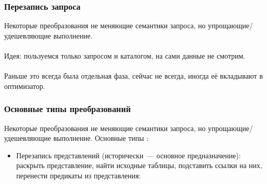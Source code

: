 \documentclass{beamer}
\begin{document}
\begin{frame}[allowframebreaks]
\frametitle{Перезапись запроса}
Некоторые преобразования не меняющие семантики запроса, но упрощающие/удешевляющие выполнение. 
\\~\\
Идея: пользуемся только запросом и каталогом, на сами данные не смотрим.
\\~\\
Раньше это всегда была отдельная фаза, сейчас не всегда, иногда её вкладывают в оптимизатор.

\end{frame}

\begin{frame}[allowframebreaks]
\frametitle{Основные типы преобразований}
Некоторые преобразования не меняющие семантики запроса, но упрощающие/удешевляющие выполнение. Основные типы \cite{Hellerstein2007}:
\begin{itemize}
  \item Перезапись представлений (исторически~--- основное предназначение):
  		раскрыть представление, найти исходные таблицы, подставить ссылки на них, перенести предикаты из представления:
  		

\end{itemize}
\end{frame}
\end{document}
